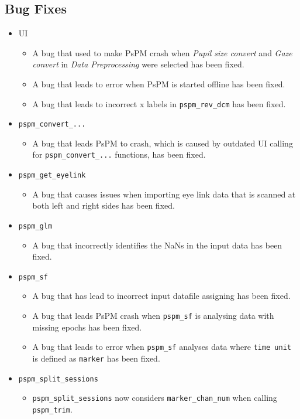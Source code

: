 \documentclass[english]{article}
\numberwithin{equation}{section}
\numberwithin{figure}{section}
\begin{document}
\subsection*{Bug Fixes}
	\begin{itemize}
		\item UI
		\begin{itemize}
			\item A bug that used to make PsPM crash when \textit{Pupil size convert} and 
						\textit{Gaze convert} in \textit{Data Preprocessing} were selected has been fixed.
			\item A bug that leads to error when PsPM is started offline has been fixed.
			\item A bug that leads to incorrect x labels in \texttt{pspm\_rev\_dcm} has been fixed.
		\end{itemize}
		\item \texttt{pspm\_convert\_...}
		\begin{itemize}
			\item A bug that leads PsPM to crash, which is caused by outdated UI calling for 
						\texttt{pspm\_convert\_...} functions, has been fixed.
		\end{itemize}
		\item \texttt{pspm\_get\_eyelink}
		\begin{itemize}
			\item A bug that causes issues when importing eye link data that is scanned at both 
						left and right sides has been fixed.
		\end{itemize}
		\item \texttt{pspm\_glm}
		\begin{itemize}
			\item A bug that incorrectly identifies the NaNs in the input data has been fixed.
		\end{itemize}
		\item \texttt{pspm\_sf}
		\begin{itemize}
			\item A bug that has lead to incorrect input datafile assigning has been fixed.
			\item A bug that leads PsPM crash when \texttt{pspm\_sf} is analysing data with 
						missing epochs has been fixed.
			\item A bug that leads to error when \texttt{pspm\_sf} analyses data where 
						\texttt{time unit} is defined as \texttt{marker} has been fixed.
		\end{itemize}
		\item \texttt{pspm\_split\_sessions}
		\begin{itemize}
			\item \texttt{pspm\_split\_sessions} now considers \texttt{marker\_chan\_num} when 
						calling \texttt{pspm\_trim}.
		\end{itemize}
	\end{itemize}
	
\end{document}
